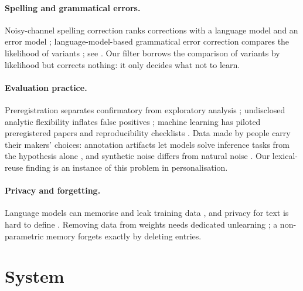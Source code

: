 \documentclass[10pt,twocolumn]{article}
\begin{document}
\paragraph{Spelling and grammatical errors.} Noisy-channel spelling correction ranks corrections with a language model
and an error model \citep{kernighan1990spelling}; language-model-based grammatical error correction compares the
likelihood of variants \citep{bryant2018lmgec}; see \citet{bryant2023gecsurvey}. Our filter borrows the comparison of
variants by likelihood but corrects nothing: it only decides what not to learn.

\paragraph{Evaluation practice.} Preregistration separates confirmatory from exploratory analysis
\citep{nosek2018prereg}; undisclosed analytic flexibility inflates false positives \citep{simmons2011false,gelman2014crisis};
machine learning has piloted preregistered papers \citep{bertinetto2021prereg} and reproducibility checklists
\citep{pineau2021reproducibility}. Data made by people carry their makers' choices: annotation artifacts let models
solve inference tasks from the hypothesis alone \citep{gururangan2018artifacts}, and synthetic noise differs from natural
noise \citep{belinkov2018noise}. Our lexical-reuse finding is an instance of this problem in personalisation.

\paragraph{Privacy and forgetting.} Language models can memorise and leak training data \citep{carlini2021extracting},
and privacy for text is hard to define \citep{brown2022privacy}. Removing data from weights needs dedicated unlearning
\citep{bourtoule2021unlearning}; a non-parametric memory forgets exactly by deleting entries.

\section{System}\label{sec:system}
\end{document}
